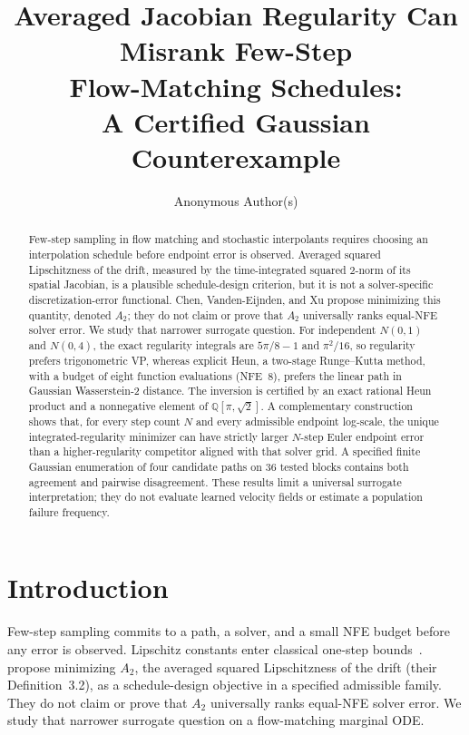 \documentclass{article}
\title{Averaged Jacobian Regularity Can Misrank Few-Step\\
Flow-Matching Schedules:\\
A Certified Gaussian Counterexample}
\author{%
  Anonymous Author(s)\\
}
\begin{document}

\maketitle

\begin{abstract}
Few-step sampling in flow matching and stochastic interpolants requires
choosing an interpolation schedule before endpoint error is observed.
Averaged squared Lipschitzness of the drift, measured by the
time-integrated squared $2$-norm of its spatial Jacobian, is a plausible
schedule-design criterion, but it is not a solver-specific
discretization-error functional. Chen, Vanden-Eijnden, and Xu propose
minimizing this quantity, denoted $A_2$; they do not claim or prove that
$A_2$ universally ranks equal-NFE solver error. We study that narrower
surrogate question. For independent $N(0,1)$ and $N(0,4)$, the exact
regularity integrals are $5\pi/8-1$ and $\pi^2/16$, so regularity prefers
trigonometric VP, whereas explicit Heun, a two-stage Runge--Kutta method,
with a budget of eight function evaluations (NFE~$8$), prefers the linear
path in Gaussian Wasserstein-2 distance. The inversion is certified by
an exact rational Heun product and a nonnegative element of
$\mathbb{Q}[\pi,\sqrt{2}]$. A complementary construction shows that, for
every step count $N$ and every admissible endpoint log-scale, the unique
integrated-regularity minimizer can have strictly larger $N$-step Euler
endpoint error than a higher-regularity competitor aligned with that
solver grid. A specified finite Gaussian enumeration of four candidate
paths on $36$ tested blocks contains both agreement and pairwise
disagreement. These results limit a universal surrogate interpretation;
they do not evaluate learned velocity fields or estimate a population
failure frequency.
\end{abstract}

\section{Introduction}

Few-step sampling commits to a path, a solver, and a small NFE budget
before any error is observed. Lipschitz constants enter classical
one-step bounds~\citep{hairer1993solving}.
\citet{lipschitzguided2025} propose minimizing $A_2$, the
averaged squared Lipschitzness of the drift (their Definition~3.2), as
a schedule-design objective in a specified admissible family. They do
not claim or prove that $A_2$ universally ranks equal-NFE solver error.
We study that narrower surrogate question on a flow-matching marginal ODE.
\end{document}
